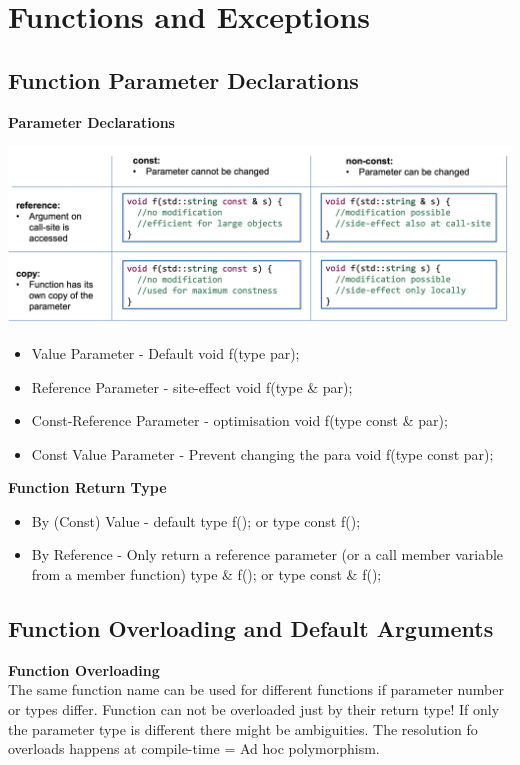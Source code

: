 
\section{Functions and Exceptions}
\subsection{Function Parameter Declarations}

\textbf{Parameter Declarations}
\begin{center}
	\includegraphics[width=0.75\linewidth]{images/functionparameters}	
\end{center}

\begin{itemize}
  \itemsep -0.5em 
  \item Value Parameter - Default void f(type par);
  \item Reference Parameter - site-effect void f(type \& par);
  \item Const-Reference Parameter - optimisation void f(type const \& par);
  \item Const Value Parameter - Prevent changing the para void f(type const par);
\end{itemize}

\textbf{Function Return Type} \\
\begin{itemize}
  \itemsep -0.5em 
  \item By (Const) Value - default type f(); or type const f();
  \item By Reference - Only return a reference parameter (or a call member variable from a member function) type \& f(); or type const \& f();
\end{itemize}

\subsection{Function Overloading and Default Arguments}
\textbf{Function Overloading} \\
The same function name can be used for different functions if parameter number or types differ. Function can not be overloaded just by their return type! If only the parameter type is different there might be ambiguities. The resolution fo overloads happens at compile-time = Ad hoc polymorphism.

